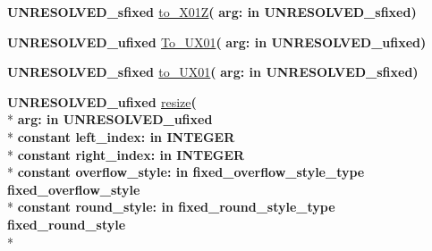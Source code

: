 \begin{DoxyCompactItemize}
{\bfseries {\bfseries \textcolor{vhdlchar}{U\+N\+R\+E\+S\+O\+L\+V\+E\+D\+\_\+sfixed}\textcolor{vhdlchar}{ }}} \hyperlink{class__fixed__pkg_a3ed6719b346c7599520f0eaf0f005525}{to\+\_\+\+X01\+Z}{\bfseries  ( }{\bfseries \textcolor{vhdlchar}{arg\+: }\textcolor{stringliteral}{in }\textcolor{vhdlchar}{U\+N\+R\+E\+S\+O\+L\+V\+E\+D\+\_\+sfixed}}{\bfseries  )} 
\item 
{\bfseries {\bfseries \textcolor{vhdlchar}{U\+N\+R\+E\+S\+O\+L\+V\+E\+D\+\_\+ufixed}\textcolor{vhdlchar}{ }}} \hyperlink{class__fixed__pkg_a96d97470cad673822d1889dfc627ec3f}{To\+\_\+\+U\+X01}{\bfseries  ( }{\bfseries \textcolor{vhdlchar}{arg\+: }\textcolor{stringliteral}{in }\textcolor{vhdlchar}{U\+N\+R\+E\+S\+O\+L\+V\+E\+D\+\_\+ufixed}}{\bfseries  )} 
\item 
{\bfseries {\bfseries \textcolor{vhdlchar}{U\+N\+R\+E\+S\+O\+L\+V\+E\+D\+\_\+sfixed}\textcolor{vhdlchar}{ }}} \hyperlink{class__fixed__pkg_a334f0e406ea4f02f81890e38376e20a1}{to\+\_\+\+U\+X01}{\bfseries  ( }{\bfseries \textcolor{vhdlchar}{arg\+: }\textcolor{stringliteral}{in }\textcolor{vhdlchar}{U\+N\+R\+E\+S\+O\+L\+V\+E\+D\+\_\+sfixed}}{\bfseries  )} 
\item 
{\bfseries {\bfseries \textcolor{vhdlchar}{U\+N\+R\+E\+S\+O\+L\+V\+E\+D\+\_\+ufixed}\textcolor{vhdlchar}{ }}} \hyperlink{class__fixed__pkg_abf2f374584cfbfe89412617938b9014a}{resize}{\bfseries  ( }\\*
{\bfseries \textcolor{vhdlchar}{arg\+: }\textcolor{stringliteral}{in }\textcolor{vhdlchar}{U\+N\+R\+E\+S\+O\+L\+V\+E\+D\+\_\+ufixed}}\\*
{\bfseries {\bfseries \textcolor{keywordflow}{constant}\textcolor{vhdlchar}{ }}\textcolor{vhdlchar}{left\+\_\+index\+: }\textcolor{stringliteral}{in }{\bfseries \textcolor{comment}{I\+N\+T\+E\+G\+E\+R}\textcolor{vhdlchar}{ }}}\\*
{\bfseries {\bfseries \textcolor{keywordflow}{constant}\textcolor{vhdlchar}{ }}\textcolor{vhdlchar}{right\+\_\+index\+: }\textcolor{stringliteral}{in }{\bfseries \textcolor{comment}{I\+N\+T\+E\+G\+E\+R}\textcolor{vhdlchar}{ }}}\\*
{\bfseries {\bfseries \textcolor{keywordflow}{constant}\textcolor{vhdlchar}{ }}\textcolor{vhdlchar}{overflow\+\_\+style\+: }\textcolor{stringliteral}{in }\textcolor{vhdlchar}{fixed\+\_\+overflow\+\_\+style\+\_\+type     fixed\+\_\+overflow\+\_\+style}}\\*
{\bfseries {\bfseries \textcolor{keywordflow}{constant}\textcolor{vhdlchar}{ }}\textcolor{vhdlchar}{round\+\_\+style\+: }\textcolor{stringliteral}{in }\textcolor{vhdlchar}{fixed\+\_\+round\+\_\+style\+\_\+type     fixed\+\_\+round\+\_\+style}}\\*

\end{DoxyCompactItemize}
